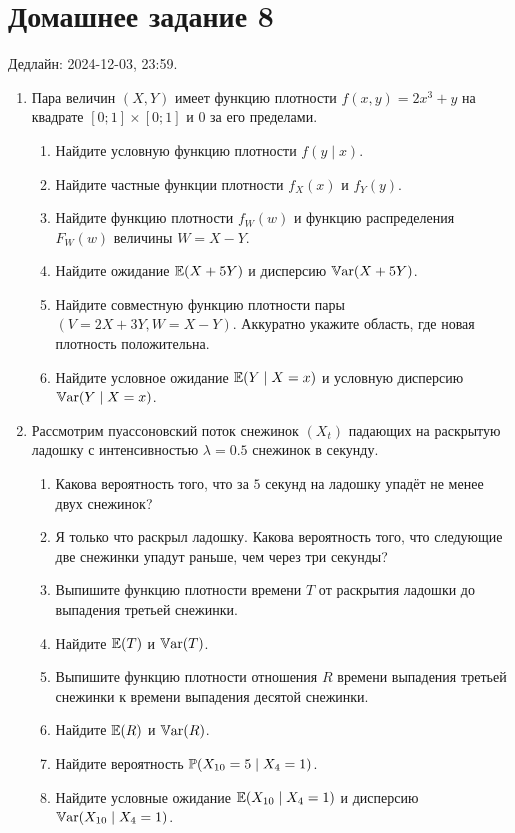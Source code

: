 \section*{Домашнее задание 8}


Дедлайн: 2024-12-03, 23:59.

\begin{enumerate}

\item Пара величин $(X, Y)$ имеет функцию плотности $f(x, y) = 2x^3 + y$ на квадрате $[0;1] \times [0;1]$ и $0$ за его пределами. 
\begin{enumerate}
    \item Найдите условную функцию плотности $f(y \mid x)$.
    \item Найдите частные функции плотности $f_X(x)$ и $f_Y(y)$.
    \item Найдите функцию плотности $f_W(w)$ и функцию распределения $F_W(w)$ величины $W = X - Y$. 
    \item Найдите ожидание $\E(X + 5Y)$ и дисперсию $\Var(X + 5Y)$.
    \item Найдите совместную функцию плотности пары $(V = 2X + 3Y, W = X - Y)$. Аккуратно укажите область, где новая плотность положительна. 
    \item Найдите условное ожидание $\E(Y \mid X = x)$ и условную дисперсию $\Var(Y \mid X = x)$.
\end{enumerate}

\item Рассмотрим пуассоновский поток снежинок $(X_t)$ падающих на раскрытую ладошку с интенсивностью $\lambda = 0.5$ снежинок в секунду.
\begin{enumerate}
    \item Какова вероятность того, что за $5$ секунд на ладошку упадёт не менее двух снежинок?
    \item Я только что раскрыл ладошку. Какова вероятность того, что следующие две снежинки упадут раньше, чем через три секунды?
    \item Выпишите функцию плотности времени $T$ от раскрытия ладошки до выпадения третьей снежинки. 
    \item Найдите $\E(T)$ и $\Var(T)$.
    \item Выпишите функцию плотности отношения $R$ времени выпадения третьей снежинки к времени выпадения десятой снежинки. 
    \item Найдите $\E(R)$ и $\Var(R)$.
    \item Найдите вероятность $\P(X_{10} = 5 \mid X_{4} = 1)$.
    \item Найдите условные ожидание $\E(X_{10} \mid X_{4} = 1)$ и дисперсию $\Var(X_{10} \mid X_4 = 1)$.
\end{enumerate}


\end{enumerate}
